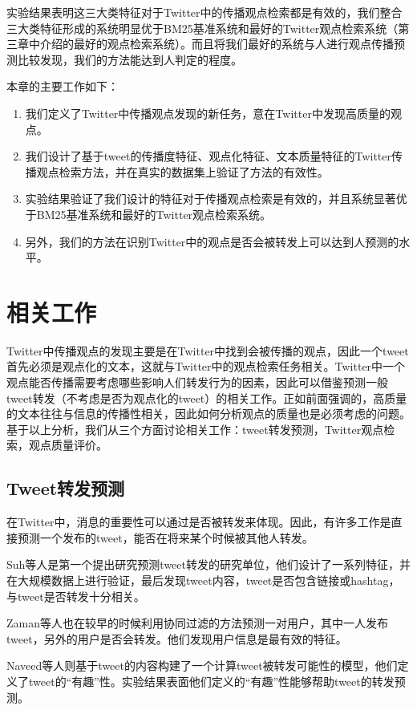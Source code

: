实验结果表明这三大类特征对于Twitter中的传播观点检索都是有效的，我们整合三大类特征形成的系统明显优于BM25基准系统和最好的Twitter观点检索系统（第三章中介绍的最好的观点检索系统）。而且将我们最好的系统与人进行观点传播预测比较发现，我们的方法能达到人判定的程度。

本章的主要工作如下：
\begin{enumerate}
\item 我们定义了Twitter中传播观点发现的新任务，意在Twitter中发现高质量的观点。
\item 我们设计了基于tweet的传播度特征、观点化特征、文本质量特征的Twitter传播观点检索方法，并在真实的数据集上验证了方法的有效性。
\item 实验结果验证了我们设计的特征对于传播观点检索是有效的，并且系统显著优于BM25基准系统和最好的Twitter观点检索系统。
\item 另外，我们的方法在识别Twitter中的观点是否会被转发上可以达到人预测的水平。
\end{enumerate}

\section{相关工作}
\label{rel_prop_3}
Twitter中传播观点的发现主要是在Twitter中找到会被传播的观点，因此一个tweet首先必须是观点化的文本，这就与Twitter中的观点检索任务相关。Twitter中一个观点能否传播需要考虑哪些影响人们转发行为的因素，因此可以借鉴预测一般tweet转发（不考虑是否为观点化的tweet）的相关工作。正如前面强调的，高质量的文本往往与信息的传播性相关，因此如何分析观点的质量也是必须考虑的问题。基于以上分析，我们从三个方面讨论相关工作：tweet转发预测，Twitter观点检索，观点质量评价。

\subsection{Tweet转发预测}
\label{rel_retweet}
在Twitter中，消息的重要性可以通过是否被转发来体现。因此，有许多工作是直接预测一个发布的tweet，能否在将来某个时候被其他人转发。

Suh等人是第一个提出研究预测tweet转发的研究单位，他们设计了一系列特征，并在大规模数据上进行验证，最后发现tweet内容，tweet是否包含链接或hashtag，与tweet是否转发十分相关。

Zaman等人也在较早的时候利用协同过滤的方法预测一对用户，其中一人发布tweet，另外的用户是否会转发。他们发现用户信息是最有效的特征。

Naveed等人则基于tweet的内容构建了一个计算tweet被转发可能性的模型，他们定义了tweet的“有趣”性。实验结果表面他们定义的“有趣”性能够帮助tweet的转发预测。

